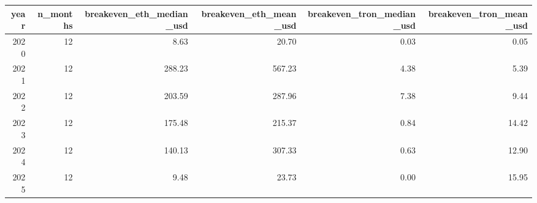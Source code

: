 \begin{tabular}{rrrrrr}
\toprule
year & n_months & breakeven_eth_median_usd & breakeven_eth_mean_usd & breakeven_tron_median_usd & breakeven_tron_mean_usd \\
\midrule
2020 & 12 & 8.63 & 20.70 & 0.03 & 0.05 \\
2021 & 12 & 288.23 & 567.23 & 4.38 & 5.39 \\
2022 & 12 & 203.59 & 287.96 & 7.38 & 9.44 \\
2023 & 12 & 175.48 & 215.37 & 0.84 & 14.42 \\
2024 & 12 & 140.13 & 307.33 & 0.63 & 12.90 \\
2025 & 12 & 9.48 & 23.73 & 0.00 & 15.95 \\
\bottomrule
\end{tabular}
